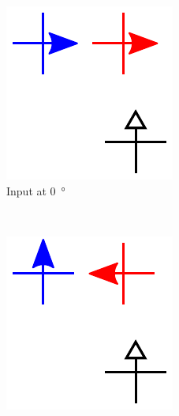 \documentclass[11pt,a4paper,english]{article}
\newcommand{\rulesep}{\unskip\ \vrule\ }
\begin{document}
\begin{figure}
\centering
\begin{subfigure}[t]{0.23\textwidth}
    \includegraphics[width=\textwidth]{Figures/half_adder/schematic/000006_inputs_In1_0213/Input 0 deg.pdf}
    \caption{Input at \SI{0}{\degree}}
\end{subfigure}
\rulesep
\begin{subfigure}[t]{0.23\textwidth}
    \includegraphics[width=\textwidth]{Figures/half_adder/schematic/000006_inputs_In1_0213/Input 90 deg.pdf}

\end{subfigure}
\end{figure}
\end{document}
